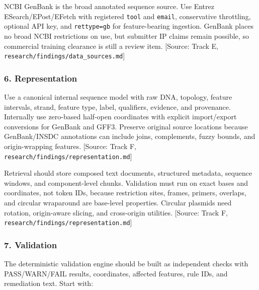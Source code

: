 \documentclass[11pt]{report}
\begin{document}
NCBI GenBank is the broad annotated sequence source. Use Entrez ESearch/EPost/EFetch with registered \texttt{tool} and \texttt{email}, conservative throttling, optional API key, and \texttt{rettype=gb} for feature-bearing ingestion. GenBank places no broad NCBI restrictions on use, but submitter IP claims remain possible, so commercial training clearance is still a review item. [Source: Track E, \texttt{research/findings/data\_sources.md}]\par

\subsubsection{6. Representation}

Use a canonical internal sequence model with raw DNA, topology, feature intervals, strand, feature type, label, qualifiers, evidence, and provenance. Internally use zero-based half-open coordinates with explicit import/export conversions for GenBank and GFF3. Preserve original source locations because GenBank/INSDC annotations can include joins, complements, fuzzy bounds, and origin-wrapping features. [Source: Track F, \texttt{research/findings/representation.md}]\par

Retrieval should store composed text documents, structured metadata, sequence windows, and component-level chunks. Validation must run on exact bases and coordinates, not token IDs, because restriction sites, frames, primers, overlaps, and circular wraparound are base-level properties. Circular plasmids need rotation, origin-aware slicing, and cross-origin utilities. [Source: Track F, \texttt{research/findings/representation.md}]\par

\subsubsection{7. Validation}

The deterministic validation engine should be built as independent checks with PASS/WARN/FAIL results, coordinates, affected features, rule IDs, and remediation text. Start with:\par
\end{document}
